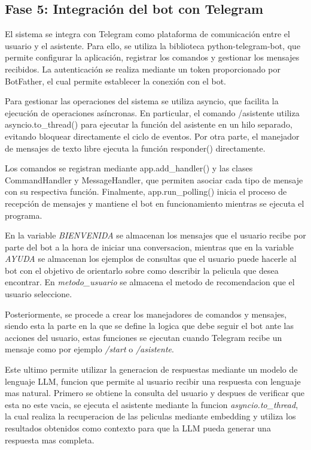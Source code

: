 ﻿\subsection{Fase 5: Integración del bot con Telegram}

El sistema se integra con Telegram como plataforma de comunicación entre el usuario y el asistente. Para ello, se utiliza la biblioteca python-telegram-bot, que permite configurar la aplicación, registrar los comandos y gestionar los mensajes recibidos. La autenticación se realiza mediante un token proporcionado por BotFather, el cual permite establecer la conexión con el bot.

Para gestionar las operaciones del sistema se utiliza asyncio, que facilita la ejecución de operaciones asíncronas. En particular, el comando /asistente utiliza asyncio.to_thread() para ejecutar la función del asistente en un hilo separado, evitando bloquear directamente el ciclo de eventos. Por otra parte, el manejador de mensajes de texto libre ejecuta la función responder() directamente.

Los comandos se registran mediante app.add_handler() y las clases CommandHandler y MessageHandler, que permiten asociar cada tipo de mensaje con su respectiva función. Finalmente, app.run_polling() inicia el proceso de recepción de mensajes y mantiene el bot en funcionamiento mientras se ejecuta el programa.

En la variable \textit{BIENVENIDA} se almacenan los mensajes que el usuario recibe por parte del bot a la hora de iniciar una conversacion, mientras que en la variable \textit{AYUDA} se almacenan los ejemplos de consultas que el usuario puede hacerle al bot con el objetivo de orientarlo sobre como describir la pelicula que desea encontrar. En \textit{metodo_usuario} se almacena el metodo de recomendacion que el usuario seleccione.

Posteriormente, se procede a crear los manejadores de comandos y mensajes, siendo esta la parte en la que se define la logica que debe seguir el bot ante las acciones del usuario, estas funciones se ejecutan cuando Telegram recibe un mensaje como por ejemplo \textit{/start} o \textit{/asistente}.

Este ultimo permite utilizar la generacion de respuestas mediante un modelo de lenguaje LLM, funcion que permite al usuario recibir una respuesta con lenguaje mas natural. Primero se obtiene la consulta del usuario y despues de verificar que esta no este vacia, se ejecuta el asistente mediante la funcion \textit{asyncio.to\_thread}, la cual realiza la recuperacion de las peliculas mediante embedding y utiliza los resultados obtenidos como contexto para que la LLM pueda generar una respuesta mas completa.

